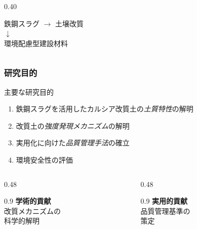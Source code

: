 \documentclass[unicode, 9pt, aspectratio=43]{beamer}
\begin{document}
\begin{refsection}
\begin{frame}
\begin{columns}
\begin{column}{0.40\linewidth}
        \vspace{1em}
        \begin{minipage}{\linewidth}
          \centering
          \small
          鉄鋼スラグ \(\to \) 土壌改質\\
          \(\downarrow \) \\
          環境配慮型建設材料
        \end{minipage}
      \end{column}
    \end{columns}
  \end{frame}

  \begin{frame}
    \frametitle{研究目的}
    \begin{center}
      \begin{minipage}{0.85\linewidth}
        \begin{block}{主要な研究目的}
          \begin{enumerate}
            \item 鉄鋼スラグを活用したカルシア改質土の\emph{土質特性}の解明
            \item 改質土の\emph{強度発現メカニズム}の解明
            \item 実用化に向けた\emph{品質管理手法}の確立
            \item 環境安全性の評価
          \end{enumerate}
        \end{block}
      \end{minipage}
    \end{center}

    \vspace{1em}

    \begin{columns}
      \begin{column}{0.48\linewidth}
        \begin{roundbox}[blue!20]{0.9\linewidth}
          \centering
          \small
          \textbf{学術的貢献}\\
          改質メカニズムの\\
          科学的解明
        \end{roundbox}
      \end{column}
      \begin{column}{0.48\linewidth}
        \begin{roundbox}[green!20]{0.9\linewidth}
          \centering
          \small
          \textbf{実用的貢献}\\
          品質管理基準の\\
          策定
        \end{roundbox}
      \end{column}
    \end{columns}
  \end{frame}


\end{refsection}
\end{document}
